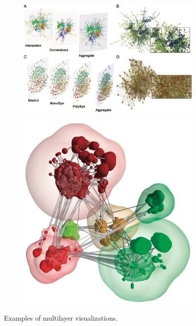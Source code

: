\begin{figure}[!hbt]
    \centering
    \begin{subfigure}[b]{0.75\columnwidth}
        \centering
        \includegraphics[width=\textwidth]{graphics/muxVisExample.jpg}
        \label{fig:muxVisExample}
    \end{subfigure}
    \begin{subfigure}[b]{0.45\columnwidth}
        \centering
        \includegraphics[width=\textwidth]{graphics/clusteredGraphVis.jpg}
        \label{fig:clusteredGraph}
    \end{subfigure}
    
    \caption{Examples of multilayer visualizations.} %
    \label{fig:relatedWorkExamples} 
  \end{figure}

